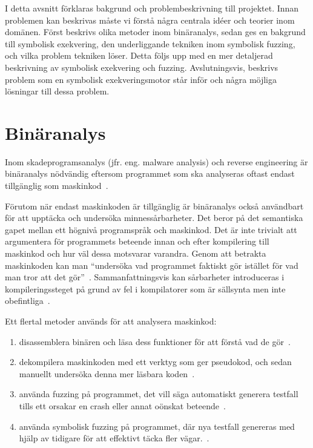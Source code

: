 I detta avsnitt förklaras bakgrund och problembeskrivning till projektet. Innan
problemen kan beskrivas måste vi förstå några centrala idéer och teorier inom
domänen. Först beskrivs olika metoder inom binäranalys, sedan ges en bakgrund
till symbolisk exekvering, den underliggande tekniken inom symbolisk fuzzing, och vilka
problem tekniken löser. Detta följs upp med en mer detaljerad beskrivning av symbolisk
exekvering och fuzzing. Avslutningsvis, beskrivs problem som en symbolisk exekveringsmotor
står inför och några möjliga lösningar till dessa problem.

\section{Binäranalys}
\label{sec:binar_analys}
Inom skadeprogramsanalys (jfr. eng. malware analysis) och reverse engineering 
är binäranalys nödvändig eftersom programmet som ska analyseras oftast endast
tillgänglig som maskinkod~\cite{andriesse2018}.

Förutom när endast maskinkoden är tillgänglig är binäranalys också användbart
för att upptäcka och undersöka minnessårbarheter. Det beror på det semantiska
gapet mellan ett högnivå programspråk och maskinkod. Det är inte trivialt att
argumentera för programmets beteende innan och efter kompilering till maskinkod
och hur väl dessa motsvarar varandra. Genom att betrakta maskinkoden kan man
``undersöka vad programmet faktiskt gör istället för vad man tror att det
gör''~\cite{andriesse2018}. Sammanfattningsvis kan sårbarheter introduceras i
kompileringssteget på grund av fel i kompilatorer som är sällsynta men
inte obefintliga~\cite{silentbugsmatter}.

Ett flertal metoder används för att analysera maskinkod:
\begin{enumerate}
    \item disassemblera binären och läsa dess funktioner för att förstå vad de gör~\cite{ghidra_website}.
    \item dekompilera maskinkoden med ett verktyg som ger pseudokod, och sedan manuellt undersöka denna mer läsbara koden~\cite{ghidra_website}.
    \item använda fuzzing på programmet, det vill säga automatiskt generera testfall tills ett orsakar en crash eller
          annat oönskat beteende~\cite{8371326}.
    \item använda symbolisk fuzzing på programmet, där nya testfall genereras med hjälp av tidigare för att effektivt täcka fler vägar.~\cite{sage}.
\end{enumerate}

